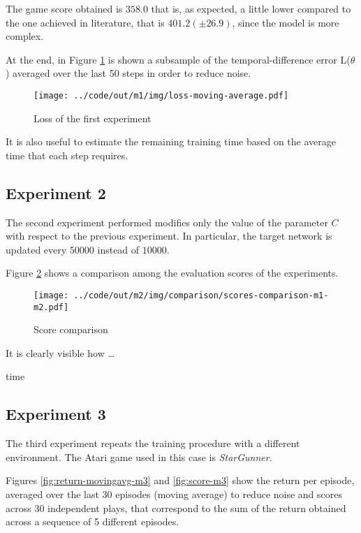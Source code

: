 \documentclass[a4paper,12pt]{article} %
\begin{document}
	The game score obtained is $358.0$ that is, as expected, a little lower compared to the one achieved in literature, that is $401.2 (\pm 26.9)$, since the model is more complex.
	
	\bigskip
		
	At the end, in Figure \ref{fig:loss-m1} is shown a subsample of the temporal-difference error L($\theta$) averaged over the last 50 steps in order to reduce noise.
	\begin{figure}[htb]
		\centering
		\texttt{[image: ../code/out/m1/img/loss-moving-average.pdf]}	
		\caption{Loss of the first experiment}
		\label{fig:loss-m1}
	\end{figure} 


	It is also useful to estimate the remaining training time based on the average time that each step requires.
	
	\subsection{Experiment 2}
	The second experiment performed modifies only the value of the parameter $C$ with respect to the previous experiment. In particular, the target network is updated every $50000$ instead of $10000$.
	
	Figure \ref{fig:score-m1-m2} shows a comparison among the evaluation scores of the experiments.
	
	\begin{figure}[htb]
		\centering
		\texttt{[image: ../code/out/m2/img/comparison/scores-comparison-m1-m2.pdf]}	
		\caption{Score comparison}
		\label{fig:score-m1-m2}
	\end{figure}
	
	It is clearly visible how … 
	\bigskip
	
	time
	
	\subsection{Experiment 3}
	The third experiment repeats the training procedure with a different environment. The Atari game used in this case is \textit{StarGunner}.
	
	Figures \ref{fig:return-movingavg-m3} and \ref{fig:score-m3} show the return per episode, averaged over the last 30 episodes (moving average) to reduce noise and scores across 30 independent plays, that correspond to the sum of the return obtained across a sequence of 5 different episodes.
	
\end{document}
